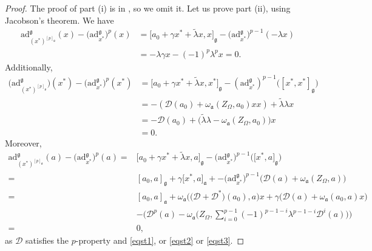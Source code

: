 \documentclass[10pt,a4paper]{amsart}
\numberwithin{equation}{section}
\begin{document}
\begin{proof} The proof of part (i) is in \cite{BM}, so we omit it. Let us prove part (ii), using Jacobson's theorem. We have
\begin{align*}
\mathrm{ad}_{(x^*)^{[p]_\mathfrak{g}}}^\mathfrak{g}(x)-\bigl(\mathrm{ad}_{x^*}^\mathfrak{g}\bigr)^p(x) &= \big[a_0+\gamma x^*+\tilde \lambda x,x\big]_\mathfrak{g}-\bigl(\mathrm{ad}_{x^*}^\mathfrak{g}\bigr)^{p-1}(-\lambda x)\\
 &= -\lambda \gamma x-(-1)^p \lambda^px=0.
\end{align*}
Additionally,
\begin{align*}
\bigl(\mathrm{ad}_{(x^*)^{[p]_\mathfrak{g}}}^\mathfrak{g}\bigr)(x^*)-\bigl(\mathrm{ad}_{x^*}^\mathfrak{g}\bigr)^p(x^*) &= \big[a_0+\gamma x^*+\tilde \lambda x,x^*\big]_\mathfrak{g}-(\mathrm{ad}_{x^*}^\mathfrak{g})^{p-1}\bigl([x^*,x^*]_\mathfrak{g}\bigr)\\
 &= -(\mathscr{D}(a_0)+\omega_\mathfrak{a}(Z_\Omega,a_0)xx)+\tilde \lambda \lambda x\\
 &= -\mathscr{D}(a_0)+\bigl(\tilde \lambda \lambda-\omega_\mathfrak{a}(Z_\Omega,a_0)\bigr)x\\
 &=0.
\end{align*}
Moreover,
\begin{align*}
\mathrm{ad}_{(x^*)^{[p]_\mathfrak{g}}}^\mathfrak{g}(a)-\bigl(\mathrm{ad}_{x^*}^\mathfrak{g}\bigr)^p(a) ={}& \big[a_0+\gamma x^*+\tilde \lambda x,a\big]_\mathfrak{g}-\bigl(\mathrm{ad}_{x^*}^\mathfrak{g}\bigr)^{p-1}\bigl(\big[x^*,a\big]_\mathfrak{g}\bigr)\\
={}& [a_0,a]_\mathfrak{g}+\gamma\big[ x^*,a\big]_\mathfrak{a}+-\bigl(\mathrm{ad}_{x^*}^\mathfrak{g}\bigr)^{p-1}\bigl(\mathscr{D}(a)+\omega_\mathfrak{a}(Z_\Omega,a)\bigr)\\
={}& [a_0,a]_\mathfrak{a}+\omega_\mathfrak{a}\bigl(\bigl({\mathscr D}+{\mathscr D}^*\bigr)(a_0),a\bigr)x+\gamma\bigl({\mathscr D} (a)+ \omega_\mathfrak{a}(a_0,a)x\bigr)\\
&- \bigg(\mathscr{D}^p(a)- \omega_\mathfrak{a}\bigg( Z_\Omega, \sum_{i=0}^{p-1} (-1)^{p-1-i}\lambda^{p-1-i} {\mathscr D}^i(a)\bigg)\bigg)\\
={}&0,
\end{align*}
as ${\mathscr D}$ satisfies the $p$-property and \eqref{eqst1}, or \eqref{eqst2} or \eqref{eqst3}.


\end{proof}
\end{document}
